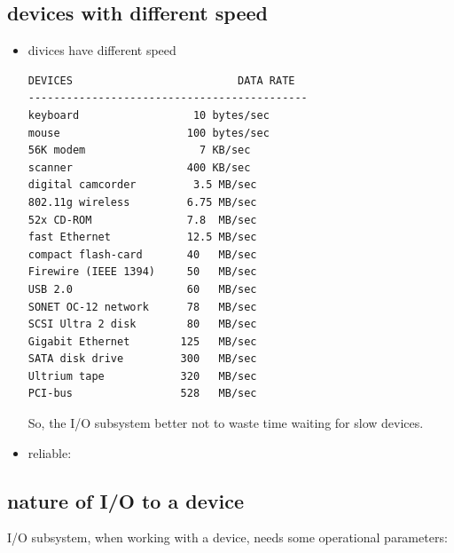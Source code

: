 \subsection{devices with different speed}

\begin{itemize}
  \item divices have different speed

\begin{verbatim}
DEVICES                          DATA RATE
--------------------------------------------
keyboard                  10 bytes/sec
mouse                    100 bytes/sec
56K modem                  7 KB/sec
scanner                  400 KB/sec
digital camcorder         3.5 MB/sec
802.11g wireless         6.75 MB/sec
52x CD-ROM               7.8  MB/sec
fast Ethernet            12.5 MB/sec
compact flash-card       40   MB/sec
Firewire (IEEE 1394)     50   MB/sec
USB 2.0                  60   MB/sec
SONET OC-12 network      78   MB/sec
SCSI Ultra 2 disk        80   MB/sec
Gigabit Ethernet        125   MB/sec
SATA disk drive         300   MB/sec
Ultrium tape            320   MB/sec
PCI-bus                 528   MB/sec
\end{verbatim}  

So, the I/O subsystem better not to waste time waiting for slow devices.

  \item reliable:
\end{itemize}

\subsection{nature of I/O to a device}

I/O subsystem, when working with a device, needs some operational parameters:

